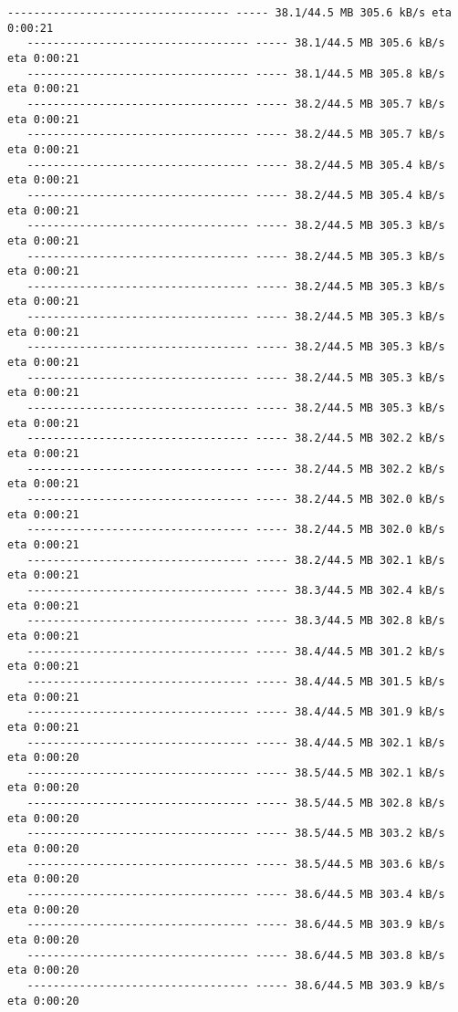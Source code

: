 \documentclass[11pt]{article}
\begin{document}
\begin{Verbatim}[commandchars=\\\{\}]
   ---------------------------------- ----- 38.1/44.5 MB 305.6 kB/s eta 0:00:21
   ---------------------------------- ----- 38.1/44.5 MB 305.6 kB/s eta 0:00:21
   ---------------------------------- ----- 38.1/44.5 MB 305.8 kB/s eta 0:00:21
   ---------------------------------- ----- 38.2/44.5 MB 305.7 kB/s eta 0:00:21
   ---------------------------------- ----- 38.2/44.5 MB 305.7 kB/s eta 0:00:21
   ---------------------------------- ----- 38.2/44.5 MB 305.4 kB/s eta 0:00:21
   ---------------------------------- ----- 38.2/44.5 MB 305.4 kB/s eta 0:00:21
   ---------------------------------- ----- 38.2/44.5 MB 305.3 kB/s eta 0:00:21
   ---------------------------------- ----- 38.2/44.5 MB 305.3 kB/s eta 0:00:21
   ---------------------------------- ----- 38.2/44.5 MB 305.3 kB/s eta 0:00:21
   ---------------------------------- ----- 38.2/44.5 MB 305.3 kB/s eta 0:00:21
   ---------------------------------- ----- 38.2/44.5 MB 305.3 kB/s eta 0:00:21
   ---------------------------------- ----- 38.2/44.5 MB 305.3 kB/s eta 0:00:21
   ---------------------------------- ----- 38.2/44.5 MB 305.3 kB/s eta 0:00:21
   ---------------------------------- ----- 38.2/44.5 MB 302.2 kB/s eta 0:00:21
   ---------------------------------- ----- 38.2/44.5 MB 302.2 kB/s eta 0:00:21
   ---------------------------------- ----- 38.2/44.5 MB 302.0 kB/s eta 0:00:21
   ---------------------------------- ----- 38.2/44.5 MB 302.0 kB/s eta 0:00:21
   ---------------------------------- ----- 38.2/44.5 MB 302.1 kB/s eta 0:00:21
   ---------------------------------- ----- 38.3/44.5 MB 302.4 kB/s eta 0:00:21
   ---------------------------------- ----- 38.3/44.5 MB 302.8 kB/s eta 0:00:21
   ---------------------------------- ----- 38.4/44.5 MB 301.2 kB/s eta 0:00:21
   ---------------------------------- ----- 38.4/44.5 MB 301.5 kB/s eta 0:00:21
   ---------------------------------- ----- 38.4/44.5 MB 301.9 kB/s eta 0:00:21
   ---------------------------------- ----- 38.4/44.5 MB 302.1 kB/s eta 0:00:20
   ---------------------------------- ----- 38.5/44.5 MB 302.1 kB/s eta 0:00:20
   ---------------------------------- ----- 38.5/44.5 MB 302.8 kB/s eta 0:00:20
   ---------------------------------- ----- 38.5/44.5 MB 303.2 kB/s eta 0:00:20
   ---------------------------------- ----- 38.5/44.5 MB 303.6 kB/s eta 0:00:20
   ---------------------------------- ----- 38.6/44.5 MB 303.4 kB/s eta 0:00:20
   ---------------------------------- ----- 38.6/44.5 MB 303.9 kB/s eta 0:00:20
   ---------------------------------- ----- 38.6/44.5 MB 303.8 kB/s eta 0:00:20
   ---------------------------------- ----- 38.6/44.5 MB 303.9 kB/s eta 0:00:20

\end{Verbatim}
\end{document}
